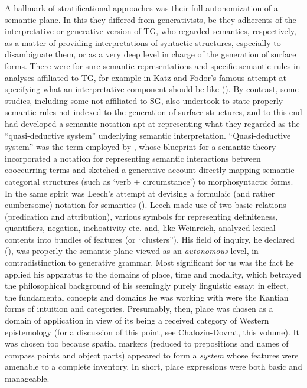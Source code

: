 \documentclass[output=paper]{langscibook}
\begin{document}
A hallmark of stratificational approaches was their full autonomization of a semantic plane. In this they differed from generativists, be they adherents of the interpretative or generative version of TG, who regarded semantics, respectively, as a matter of providing interpretations of syntactic structures, especially to disambiguate them, or as a very deep level in charge of the generation of surface forms. There were for sure semantic representations and specific semantic rules in analyses affiliated to TG, for example in Katz and Fodor’s famous attempt at specifying what an interpretative component should be like (\citealt{katz_structure_1963}). By contrast, some studies, including some not affiliated to SG, also undertook to state properly semantic rules not indexed to the generation of surface structures, and to this end had developed a semantic notation apt at representing what they regarded as the “quasi-deductive system” underlying semantic interpretation. “Quasi-deductive system” was the term employed by \citet[163]{Weinreich1972}, whose blueprint for a semantic theory incorporated a notation for representing semantic interactions between cooccurring terms and sketched a generative account directly mapping semantic-categorial structures (such as ‘verb + circumstance’) to morphosyntactic forms. In the same spirit was Leech’s attempt at devising a formulaic (and rather cumbersome) notation for semantics (\citeyear{Leech1969}). Leech made use of two basic relations (predication and attribution), various symbols for representing definiteness, quantifiers, negation, inchoativity etc. and, like Weinreich, analyzed lexical contents into bundles of features (or “clusters”). His field of inquiry, he declared (\citeyear[28--30]{Leech1969}), was properly the semantic plane viewed as an \textit{autonomous} level, in contradistinction to generative grammar. Most significant for us was the fact he applied his apparatus to the domains of place, time and modality, which betrayed the philosophical background of his seemingly purely linguistic essay: in effect, the fundamental concepts and domains he was working with were the Kantian forms of intuition and categories. Presumably, then, place was chosen as a domain of application in view of its being a received category of Western epistemology (for a discussion of this point, see Chalozin-Dovrat, this volume). It was chosen too because spatial markers (reduced to prepositions and names of compass points and object parts) appeared to form a \textit{system} whose features were amenable to a complete inventory. In short, place expressions were both basic and manageable.
\end{document}
